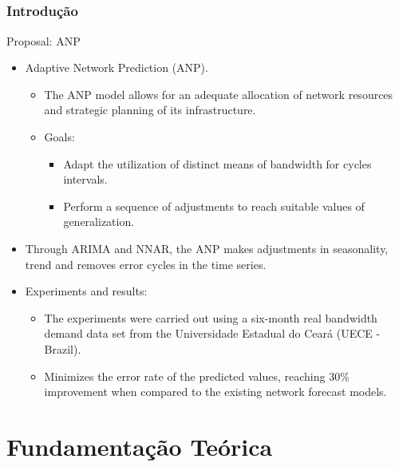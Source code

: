 \documentclass[aspectratio=169]{beamer}
\begin{document}
\subsection{}
\begin{frame}
\frametitle{Introdução}
\begin{block}{Proposal: ANP}
    \begin{itemize}
        \item Adaptive Network Prediction (ANP).
        \begin{itemize}[triangle]\small
        	\item The ANP model allows for an adequate allocation of network resources and strategic planning of its infrastructure.
            \item Goals:
            \begin{itemize}[square]\small
            	\item Adapt the utilization of distinct means of bandwidth for cycles intervals.
            	\item Perform a sequence of adjustments to reach suitable values of generalization.
            \end{itemize}
        \end{itemize}
        \item Through ARIMA and NNAR, the ANP makes adjustments in seasonality, trend and removes error cycles in the time series.
        \item Experiments and results:
        \begin{itemize}[triangle]\small
        	\item The experiments were carried out using a six-month real bandwidth demand data set from the Universidade Estadual do Ceará (UECE - Brazil).
        	\item Minimizes the error rate of the predicted values, reaching 30\% improvement when compared to the existing network forecast models.
        \end{itemize}
    \end{itemize}
\end{block}
\end{frame}

\section{Fundamentação Teórica}
\end{document}
